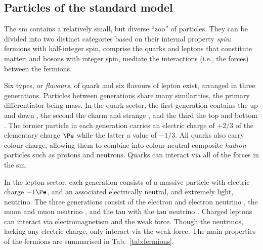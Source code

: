 

\subsection{Particles of the standard model}
\label{subsec:theory_sm_particles}

The \acrlong{sm} contains a relatively small, but diverse ``zoo'' of particles. They can be divided into two distinct categories based on their internal property \emph{spin}: fermions with half-integer spin, comprise the quarks and leptons that constitute matter; and bosons with integer spin, mediate the interactions (i.e., the forces) between the fermions.

Six types, or \emph{flavours}, of quark and six flavours of lepton exist, arranged in three generations. Particles between generations share many similarities, the primary differentiator being mass. In the quark sector, the first generation contains the up \Pup and down \Pdown, the second the charm \Pcharm and strange \Pstrange, and the third the top \Ptop and bottom \Pbottom. The former particle in each generation carries an electric charge of $+\text{2/3}$ of the elementary charge $\Pe$ while the latter a value of $-\text{1/3}$. All quarks also carry colour charge, allowing them to combine into colour-neutral composite \emph{hadron} particles such as protons and neutrons. Quarks can interact via all of the forces in the \acrlong{sm}.

In the lepton sector, each generation consists of a massive particle with electric charge $-\text{1}\Pe$, and an associated electrically neutral, and extremely light, neutrino. The three generations consist of the electron \Pe and electron neutrino \Pnue, the muon \Pmu and muon neutrino \Pnum, and the tau \Ptau with the tau neutrino \Pnut. Charged leptons can interact via electromagnetism and the weak force. Though the neutrinos, lacking any electric charge, only interact via the weak force. The main properties of the fermions are summarised in Tab.~\ref{tab:fermions}.

